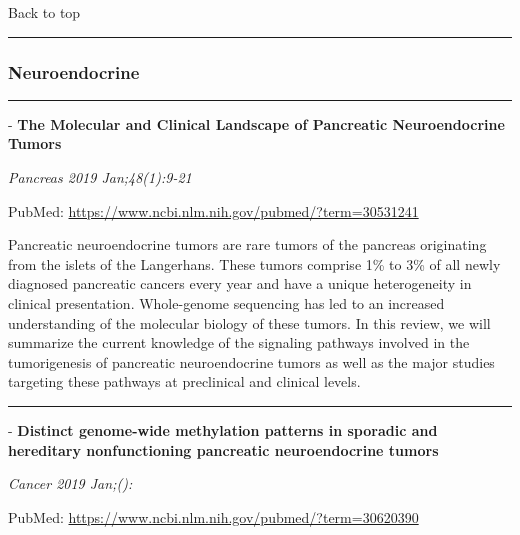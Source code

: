 \documentclass[]{article}
\begin{document}
Back to top

\begin{center}\rule{0.5\linewidth}{\linethickness}\end{center}

\pagebreak

\hypertarget{neuroendocrine-2}{%
\subsubsection{Neuroendocrine}\label{neuroendocrine-2}}

\begin{center}\rule{0.5\linewidth}{\linethickness}\end{center}

 - \textbf{The Molecular and Clinical Landscape of Pancreatic
Neuroendocrine Tumors}

\emph{Pancreas 2019 Jan;48(1):9-21}

PubMed: \url{https://www.ncbi.nlm.nih.gov/pubmed/?term=30531241}

Pancreatic neuroendocrine tumors are rare tumors of the pancreas
originating from the islets of the Langerhans. These tumors comprise 1\%
to 3\% of all newly diagnosed pancreatic cancers every year and have a
unique heterogeneity in clinical presentation. Whole-genome sequencing
has led to an increased understanding of the molecular biology of these
tumors. In this review, we will summarize the current knowledge of the
signaling pathways involved in the tumorigenesis of pancreatic
neuroendocrine tumors as well as the major studies targeting these
pathways at preclinical and clinical levels.

{}

{}

\begin{center}\rule{0.5\linewidth}{\linethickness}\end{center}

 - \textbf{Distinct genome-wide methylation patterns in sporadic and
hereditary nonfunctioning pancreatic neuroendocrine tumors}

\emph{Cancer 2019 Jan;():}

PubMed: \url{https://www.ncbi.nlm.nih.gov/pubmed/?term=30620390}
\end{document}
